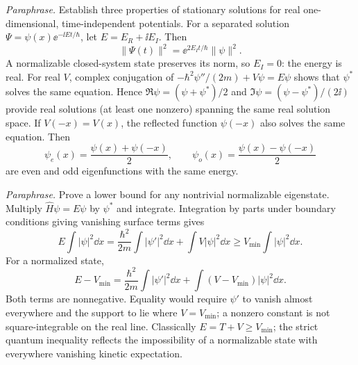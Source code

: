 \textit{Paraphrase.} Establish three properties of stationary solutions for real
one-dimensional, time-independent potentials.
For a separated solution $\Psi=\psi(x)\ee^{-\ii Et/\hbar}$, let
$E=E_R+\ii E_I$. Then
\begin{equation}
\|\Psi(t)\|^2=\ee^{2E_It/\hbar}\|\psi\|^2.
\end{equation}
A normalizable closed-system state preserves its norm, so $E_I=0$:
the energy is real. For real $V$, complex conjugation of
$-\hbar^2\psi''/(2m)+V\psi=E\psi$ shows that $\psi^*$ solves the same
equation. Hence $\Re\psi=(\psi+\psi^*)/2$ and
$\Im\psi=(\psi-\psi^*)/(2\ii)$ provide real solutions (at least one
nonzero) spanning the same real solution space. If $V(-x)=V(x)$, the
reflected function $\psi(-x)$ also solves the same equation.
Then
\begin{equation}
\psi_e(x)=\frac{\psi(x)+\psi(-x)}2,\qquad
\psi_o(x)=\frac{\psi(x)-\psi(-x)}2
\end{equation}
are even and odd eigenfunctions with the same energy.

\textit{Paraphrase.} Prove a lower bound for any nontrivial normalizable eigenstate.
Multiply $\hat H\psi=E\psi$ by $\psi^*$ and integrate. Integration by
parts under boundary conditions giving vanishing surface terms gives
\begin{equation}
E\int|\psi|^2\dd x=
\frac{\hbar^2}{2m}\int|\psi'|^2\dd x+
\int V|\psi|^2\dd x
\ge V_{\min}\int|\psi|^2\dd x .
\end{equation}
For a normalized state,
\begin{equation}
E-V_{\min}=\frac{\hbar^2}{2m}\int|\psi'|^2\dd x
+\int(V-V_{\min})|\psi|^2\dd x.
\end{equation}
Both terms are nonnegative. Equality would require $\psi'$ to
vanish almost everywhere and the support to lie where $V=V_{\min}$;
a nonzero constant is not square-integrable on the real line.
Classically $E=T+V\ge V_{\min}$; the strict quantum inequality reflects
the impossibility of a normalizable state with everywhere vanishing
kinetic expectation.


